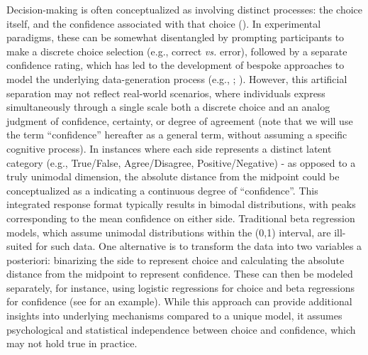 \documentclass[
  jou,
  floatsintext,
  longtable,
  nolmodern,
  notxfonts,
  notimes,
  colorlinks=true,linkcolor=blue,citecolor=blue,urlcolor=blue]{apa7}
\begin{document}
Decision-making is often conceptualized as involving distinct processes:
the choice itself, and the confidence associated with that choice
(). In
experimental paradigms, these can be somewhat disentangled by prompting
participants to make a discrete choice selection (e.g., correct
\emph{vs.} error), followed by a separate confidence rating, which has
led to the development of bespoke approaches to model the underlying
data-generation process (e.g., ; ).
However, this artificial separation may not reflect real-world
scenarios, where individuals express simultaneously through a single
scale both a discrete choice and an analog judgment of confidence,
certainty, or degree of agreement (note that we will use the term
``confidence'' hereafter as a general term, without assuming a specific
cognitive process). In instances where each side represents a distinct
latent category (e.g., True/False, Agree/Disagree, Positive/Negative) -
as opposed to a truly unimodal dimension, the absolute distance from the
midpoint could be conceptualized as a indicating a continuous degree of
``confidence''. This integrated response format typically results in
bimodal distributions, with peaks corresponding to the mean confidence
on either side. Traditional beta regression models, which assume
unimodal distributions within the (0,1) interval, are ill-suited for
such data. One alternative is to transform the data into two variables a
posteriori: binarizing the side to represent choice and calculating the
absolute distance from the midpoint to represent confidence. These can
then be modeled separately, for instance, using logistic regressions for
choice and beta regressions for confidence (see
 for an
example). While this approach can provide additional insights into
underlying mechanisms compared to a unique model, it assumes
psychological and statistical independence between choice and
confidence, which may not hold true in practice.
\end{document}
